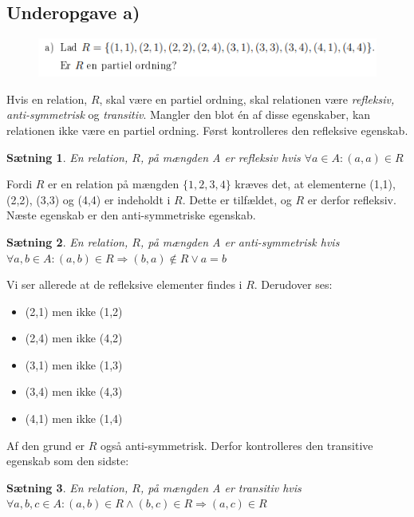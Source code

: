 \documentclass{article}
\newtheorem{theorem}{Sætning}
\begin{document}
\subsection{Underopgave a)}
\begin{figure}[h]
\begin{center}
\includegraphics[scale=0.9]{2015Opgave3FormuleringA}
\end{center}
\end{figure}

Hvis en relation, $R$, skal være en partiel ordning, skal relationen være \emph{refleksiv, anti-symmetrisk} og \emph{transitiv}. Mangler den blot én af disse egenskaber, kan relationen ikke være en partiel ordning. Først kontrolleres den refleksive egenskab.

\begin{theorem}
En relation, $R$, på mængden A er refleksiv hvis $\forall a \in A : (a,a) \in R$
\end{theorem}

Fordi $R$ er en relation på mængden $\{1, 2, 3, 4\}$ kræves det, at elementerne (1,1), (2,2), (3,3) og (4,4) er indeholdt i $R$. Dette er tilfældet, og $R$ er derfor refleksiv. Næste egenskab er den anti-symmetriske egenskab.

\begin{theorem}
En relation, $R$, på mængden A er anti-symmetrisk hvis $\forall a,b \in A : (a,b) \in R \Rightarrow (b,a) \notin R \lor a = b$
\end{theorem}

Vi ser allerede at de refleksive elementer findes i $R$. Derudover ses:

\begin{itemize}
\item (2,1) men ikke (1,2)
\item (2,4) men ikke (4,2)
\item (3,1) men ikke (1,3)
\item (3,4) men ikke (4,3)
\item (4,1) men ikke (1,4)
\end{itemize}

Af den grund er $R$ også anti-symmetrisk. Derfor kontrolleres den transitive egenskab som den sidste:

\begin{theorem}
En relation, $R$, på mængden A er transitiv hvis $\forall a,b,c \in A : (a,b)\in R \land (b,c)\in R \Rightarrow (a,c) \in R$
\end{theorem}
\end{document}
